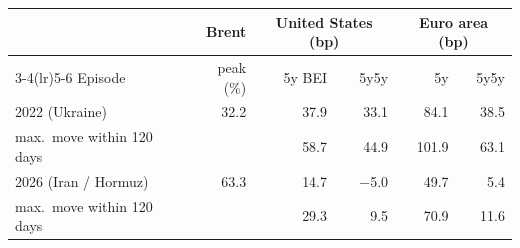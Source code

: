 \begin{tabular}{lrrrrr}
\toprule
 & Brent & \multicolumn{2}{c}{United States (bp)} & \multicolumn{2}{c}{Euro area (bp)}\\ \cmidrule(lr){3-4}\cmidrule(lr){5-6}
Episode & peak (\%) & 5y BEI & 5y5y & 5y & 5y5y\\
\midrule
2022 (Ukraine) & 32.2 & 37.9 & 33.1 & 84.1 & 38.5\\
\quad max.\ move within 120 days & & 58.7 & 44.9 & 101.9 & 63.1\\
2026 (Iran /  Hormuz) & 63.3 & 14.7 & $-$5.0 & 49.7 & 5.4\\
\quad max.\ move within 120 days & & 29.3 & 9.5 & 70.9 & 11.6\\
\bottomrule
\end{tabular}